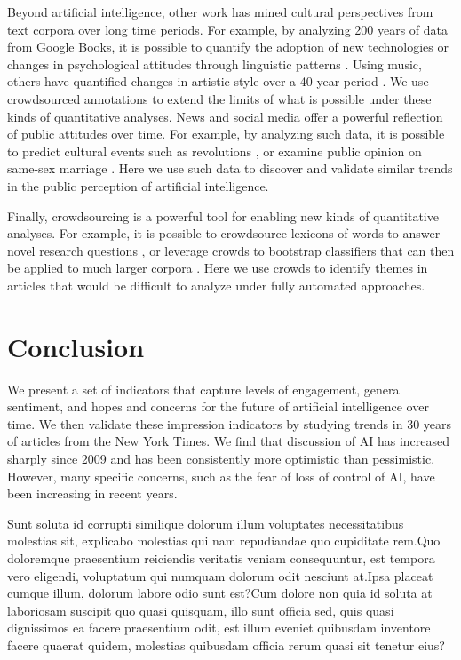 \documentclass[letterpaper]{article}
\begin{document}
Beyond artificial intelligence, other work has mined cultural perspectives from text corpora over long time periods. For example, by analyzing 200 years of data from Google Books, it is possible to quantify the adoption of new technologies or changes in psychological attitudes through linguistic patterns \cite{google-culture,psych-culture}. Using music, others have quantified changes in artistic style over a 40 year period \cite{music-over-time}. We use crowdsourced annotations to extend the limits of what is possible under these kinds of quantitative analyses.  News and social media offer a powerful reflection of public attitudes over time. For example, by analyzing such data, it is possible to predict cultural events such as revolutions \cite{future1,future2}, or examine public opinion on same-sex marriage \cite{marriage}. Here we use such data to discover and validate similar trends in the public perception of artificial intelligence.

Finally, crowdsourcing is a powerful tool for enabling new kinds of quantitative analyses. For example, it is possible to crowdsource lexicons of words to answer novel research questions \cite{empath}, or leverage crowds to bootstrap classifiers that can then be applied to much larger corpora \cite{politeness,dogmatism}. Here we use crowds to identify themes in articles that would be difficult to analyze under fully automated approaches.

\section{Conclusion}
We present a set of indicators that capture levels of engagement, general sentiment, and hopes and concerns for the future of artificial intelligence over time. We then validate these impression indicators by studying trends in 30 years of articles from the New York Times. We find that discussion of AI has increased sharply since 2009 and has been consistently more optimistic than pessimistic. However, many specific concerns, such as the fear of loss of control of AI, have been increasing in recent years.




Sunt soluta id corrupti similique dolorum illum voluptates necessitatibus molestias sit, explicabo molestias qui nam repudiandae quo cupiditate rem.Quo doloremque praesentium reiciendis veritatis veniam consequuntur, est tempora vero eligendi, voluptatum qui numquam dolorum odit nesciunt at.Ipsa placeat cumque illum, dolorum labore odio sunt est?Cum dolore non quia id soluta at laboriosam suscipit quo quasi quisquam, illo sunt officia sed, quis quasi dignissimos ea facere praesentium odit, est illum eveniet quibusdam inventore facere quaerat quidem, molestias quibusdam officia rerum quasi sit tenetur eius?\clearpage

\end{document}
